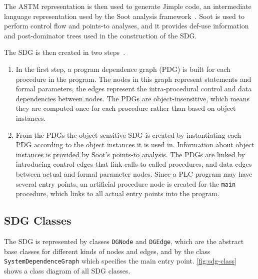 The ASTM representation is then used to generate Jimple code, an intermediate language representation used by the Soot 
analysis framework~\cite{Soot}. Soot is used to perform control flow and points-to analyses, and it provides def-use 
information and post-dominator trees used in the construction of the SDG.

The SDG is then created in two steps~\cite[ch.~6]{GrimmerDA}.

\begin{enumerate}
  \item In the first step, a program dependence graph (PDG) is built for each procedure in the program. The nodes in 
  this graph represent statements and formal parameters, the edges represent the intra-procedural control and data 
  dependencies between nodes. The PDGs are object-insensitive, which means they are computed once for each procedure 
  rather than based on object instances.
  
  \item From the PDGs the object-sensitive SDG is created by instantiating each PDG according to the object instances 
  it is used in. Information about object instances is provided by Soot's points-to analysis. The PDGs are linked by 
  introducing control edges that link calls to called procedures, and data edges between actual and formal parameter 
  nodes. Since a PLC program may have several entry points, an artificial procedure node is created for the 
  \lstinline|main| procedure, which links to all actual entry points into the program.
\end{enumerate}

\subsection{SDG Classes}

The SDG is represented by classes \lstinline|DGNode| and \lstinline|DGEdge|, which are the abstract base classes for 
different kinds of nodes and edges, and by the class \lstinline|SystemDependenceGraph| which specifies the main entry 
point. \autoref{fig:sdg-class} shows a class diagram of all SDG classes.


